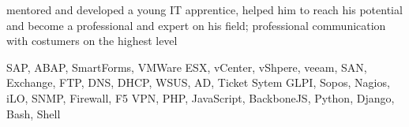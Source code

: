 \documentclass[9pt,a4paper]{altacv}
\begin{document}
mentored and developed a young IT apprentice, helped him to reach his potential and become a professional and expert on his field;
professional communication with costumers on the highest level

SAP, ABAP, SmartForms,
VMWare ESX, vCenter, vShpere, veeam, SAN,
Exchange, FTP, DNS, DHCP, WSUS, AD, Ticket Sytem GLPI,
Sopos, Nagios, iLO, SNMP, Firewall, F5 VPN,
PHP, JavaScript, BackboneJS, Python, Django, Bash, Shell
\end{document}
